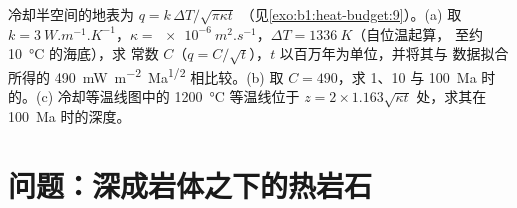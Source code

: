 \begin{exercise}[$\star\star\star$]\label{exo:b1:heat-budget:12}
冷却半空间的地表为 $q = k\,\Delta T/\sqrt{\pi\kappa t}$
（见\cref{exo:b1:heat-budget:9}）。(a) 取 $k = \qty{3}{W.m^{-1}.K^{-1}}$，$\kappa =
\qty{e-6}{m^2.s^{-1}}$，$\Delta T = \qty{1336}{K}$（自位温起算，
至约 \qty{10}{\degreeCelsius} 的海底），求
常数 $C$（$q = C/\sqrt t$），$t$ 以百万年为单位，并将其与
数据拟合所得的 \qty{490}{mW.m^{-2}.Ma^{1/2}} 相比较。(b) 取
$C = 490$，求 1、10 与 \qty{100}{Ma} 时的。(c) 冷却等温线图中的
\qty{1200}{\degreeCelsius} 等温线位于
$z = 2\times1.163\sqrt{\kappa t}$ 处，求其在 \qty{100}{Ma} 时的深度。
\end{exercise}

\section{问题：深成岩体之下的热岩石}

